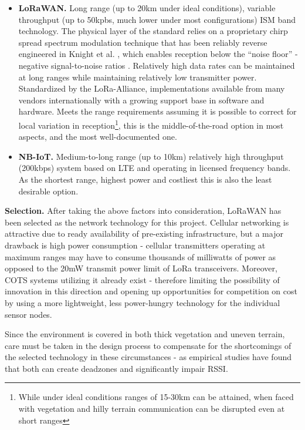 \documentclass[10pt,nocopyrightspace]{ewsn-proc}
\begin{document}
\begin{itemize}
\item \textbf{LoRaWAN.} Long range (up to 20km under ideal conditions), variable throughput (up to 50kpbs, much lower under most configurations) ISM band technology. The physical layer of the standard relies on a proprietary chirp spread spectrum modulation technique that has been reliably reverse engineered in Knight et al. \cite{Lora-decode}, which enables reception below the “noise floor” - negative signal-to-noise ratios \cite{Lora-docs}. Relatively high data rates can be maintained at long ranges while maintaining relatively low transmitter power. Standardized by the LoRa-Alliance, implementations available from many vendors internationally with a growing support base in software and hardware. Meets the range requirements assuming it is possible to correct for local variation in reception\footnote{While under ideal conditions\cite{LORAWAN-optimal} ranges of 15-30km can be attained, when faced with vegetation and hilly terrain communication can be disrupted even at short ranges\cite{LORAWAN-hills}}, this is the middle-of-the-road option in most aspects, and the most well-documented one.
\item \textbf{NB-IoT.} Medium-to-long range (up to 10km) relatively high throughput (200kbps) system based on LTE and operating in licensed frequency bands. As the shortest range, highest power and costliest this is also the least desirable option.
\end{itemize}



\textbf{Selection.} After taking the above factors into consideration, LoRaWAN has been selected as the network technology for this project. Cellular networking is attractive due to ready availability of pre-existing infrastructure, but a major drawback is high power consumption - cellular transmitters operating at maximum ranges may have to consume thousands of milliwatts of power as opposed to the 20mW transmit power limit of LoRa transceivers. \cite{Lora-docs} Moreover, COTS systems utilizing it already exist - therefore limiting the possibility of innovation in this direction and opening up opportunities for competition on cost by using a more lightweight, less power-hungry technology for the individual sensor nodes. 

Since the environment is covered in both thick vegetation and uneven terrain, care must be taken in the design process to compensate for the shortcomings of the selected technology in these circumstances - as empirical studies have found\cite{LORAWAN-hills} that both can create deadzones and significantly impair RSSI.
\end{document}
